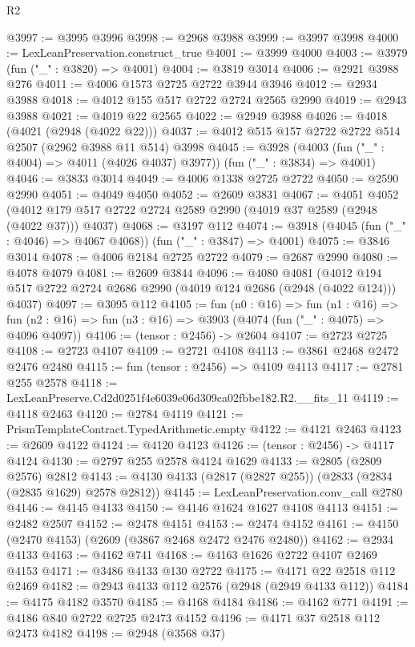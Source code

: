 \begin{lexlean}{R2}
\begin{coremodule}
@3997 := @3995 @3996
@3998 := @2968 @3988
@3999 := @3997 @3998
@4000 := LexLeanPreservation.construct_true
@4001 := @3999 @4000
@4003 := @3979 (fun ("_" : @3820) => @4001)
@4004 := @3819 @3014
@4006 := @2921 @3988 @276
@4011 := @4006 @1573 @2725 @2722 @3944 @3946
@4012 := @2934 @3988
@4018 := @4012 @155 @517 @2722 @2724 @2565 @2990
@4019 := @2943 @3988
@4021 := @4019 @22 @2565
@4022 := @2949 @3988
@4026 := @4018 (@4021 (@2948 (@4022 @22)))
@4037 := @4012 @515 @157 @2722 @2722 @514 @2507 (@2962 @3988 @11 @514) @3998
@4045 := @3928 (@4003 (fun ("_" : @4004) => @4011 (@4026 @4037) @3977)) (fun ("_" : @3834) => @4001)
@4046 := @3833 @3014
@4049 := @4006 @1338 @2725 @2722
@4050 := @2590 @2990
@4051 := @4049 @4050
@4052 := @2609 @3831
@4067 := @4051
    @4052
    (@4012 @179 @517 @2722 @2724 @2589 @2990 (@4019 @37 @2589 (@2948 (@4022 @37))) @4037)
@4068 := @3197 @112
@4074 := @3918 (@4045 (fun ("_" : @4046) => @4067 @4068)) (fun ("_" : @3847) => @4001)
@4075 := @3846 @3014
@4078 := @4006 @2184 @2725 @2722
@4079 := @2687 @2990
@4080 := @4078 @4079
@4081 := @2609 @3844
@4096 := @4080
    @4081
    (@4012 @194 @517 @2722 @2724 @2686 @2990 (@4019 @124 @2686 (@2948 (@4022 @124))) @4037)
@4097 := @3095 @112
@4105 := fun (n0 : @16) =>
  fun (n1 : @16) =>
  fun (n2 : @16) => fun (n3 : @16) => @3903 (@4074 (fun ("_" : @4075) => @4096 @4097))
@4106 := (tensor : @2456) -> @2604
@4107 := @2723 @2725
@4108 := @2723 @4107
@4109 := @2721 @4108
@4113 := @3861 @2468 @2472 @2476 @2480
@4115 := fun (tensor : @2456) => @4109 @4113
@4117 := @2781 @255 @2578
@4118 := LexLeanPreserve.Cd2d0251f4e6039e06d309ca02fbbe182.R2.__fits_11
@4119 := @4118 @2463
@4120 := @2784 @4119
@4121 := PrismTemplateContract.TypedArithmetic.empty
@4122 := @4121 @2463
@4123 := @2609 @4122
@4124 := @4120 @4123
@4126 := (tensor : @2456) -> @4117 @4124
@4130 := @2797 @255 @2578 @4124 @1629
@4133 := @2805 (@2809 @2576) @2812
@4143 := @4130 @4133 (@2817 (@2827 @255)) (@2833 (@2834 (@2835 @1629) @2578 @2812))
@4145 := LexLeanPreservation.conv_call @2780
@4146 := @4145 @4133
@4150 := @4146 @1624 @1627 @4108 @4113
@4151 := @2482 @2507
@4152 := @2478 @4151
@4153 := @2474 @4152
@4161 := @4150 (@2470 @4153) (@2609 (@3867 @2468 @2472 @2476 @2480))
@4162 := @2934 @4133
@4163 := @4162 @741
@4168 := @4163 @1626 @2722 @4107 @2469 @4153
@4171 := @3486 @4133 @130 @2722
@4175 := @4171 @22 @2518 @112 @2469
@4182 := @2943 @4133 @112 @2576 (@2948 (@2949 @4133 @112))
@4184 := @4175 @4182 @3570
@4185 := @4168 @4184
@4186 := @4162 @771
@4191 := @4186 @840 @2722 @2725 @2473 @4152
@4196 := @4171 @37 @2518 @112 @2473 @4182
@4198 := @2948 (@3568 @37)

\end{coremodule}
\end{lexlean}

